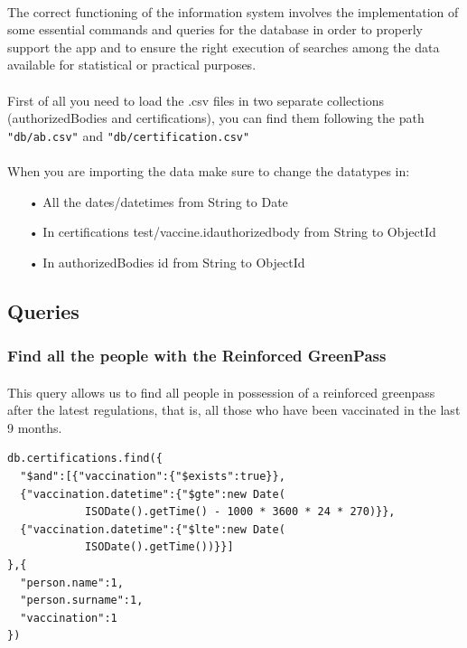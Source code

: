\documentclass[a4paper,12pt]{article}
\begin{document}
\paragraph{} The correct functioning of the information system involves the implementation of some essential commands and queries for the database in order to properly support the app and to ensure the right execution of searches among the data available for statistical or practical purposes. \par
\paragraph{} First of all you need to load the .csv files in two separate collections (authorizedBodies and certifications), you can find them following the path \texttt{"db/ab.csv"} and \texttt{"db/certification.csv"}
\paragraph{}When you are importing the data make sure to change the datatypes in:
\begin{itemize}
\item[•] All the dates/datetimes from String to Date
\item[•] In certifications test/vaccine.id\textunderscore authorized\textunderscore body from String to ObjectId
\item[•] In authorizedBodies \textunderscore id from String to ObjectId
\end{itemize}

\subsection{Queries}
\subsubsection{Find all the people with the Reinforced GreenPass}
\paragraph{} This query allows us to find all people in possession of a reinforced greenpass after the latest regulations, that is, all those who have been vaccinated in the last 9 months.
\begin{tcolorbox}[colback=green!5!white,colframe=green!75!black,title=QUERY]
\begin{verbatim}
db.certifications.find({
  "$and":[{"vaccination":{"$exists":true}},
  {"vaccination.datetime":{"$gte":new Date(
            ISODate().getTime() - 1000 * 3600 * 24 * 270)}},
  {"vaccination.datetime":{"$lte":new Date(
            ISODate().getTime())}}]
},{
  "person.name":1,
  "person.surname":1,
  "vaccination":1
})
\end{verbatim}
\end{tcolorbox}
\end{document}

